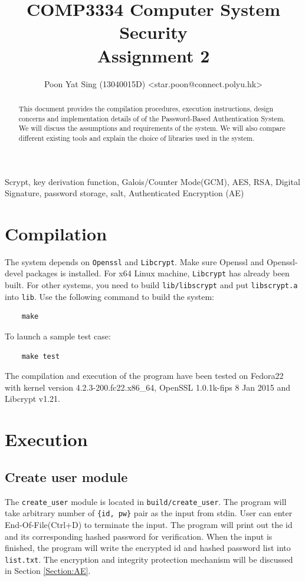 \documentclass[journal]{IEEEtran}
\begin{document}
\title{COMP3334 Computer System Security \\ Assignment 2}

\author{Poon Yat Sing (13040015D) <star.poon@connect.polyu.hk>}

\maketitle


\begin{abstract}
This document provides the compilation procedures, execution instructions, design concerns and implementation details of of the Password-Based Authentication System. We will discuss the assumptions and requirements of the system. We will also compare different existing tools and explain the choice of libraries used in the system.
\end{abstract}


\begin{IEEEkeywords}
Scrypt, key derivation function, Galois/Counter Mode(GCM), AES, RSA, Digital Signature, password storage, salt, Authenticated Encryption (AE)
\end{IEEEkeywords}

\IEEEpeerreviewmaketitle

\section{Compilation}
The system depends on \texttt{Openssl} and \texttt{Libcrypt}. Make sure Openssl and Openssl-devel packages is installed. For x64 Linux machine, \texttt{Libcrypt} has already been built. For other systems, you need to build \texttt{lib/libscrypt} and put \texttt{libscrypt.a} into \texttt{lib}. Use the following command to build the system:
\begin{lstlisting}
	make
\end{lstlisting}
To launch a sample test case:
\begin{lstlisting}
	make test
\end{lstlisting}
The compilation and execution of the program have been tested on Fedora22 with kernel version 4.2.3-200.fc22.x86\_64, OpenSSL 1.0.1k-fips 8 Jan 2015 and Libcrypt v1.21.

\section{Execution}
\subsection{Create user module}
The \texttt{create\_user} module is located in \texttt{build/create\_user}. The program will take arbitrary number of \texttt{\{id, pw\}} pair as the input from stdin. User can enter End-Of-File(Ctrl+D) to terminate the input. The program will print out the id and its corresponding hashed password for verification. When the input is finished, the program will write the encrypted id and hashed password list into \texttt{list.txt}. The encryption and integrity protection mechanism will be discussed in Section \ref{Section:AE}.
\end{document}

